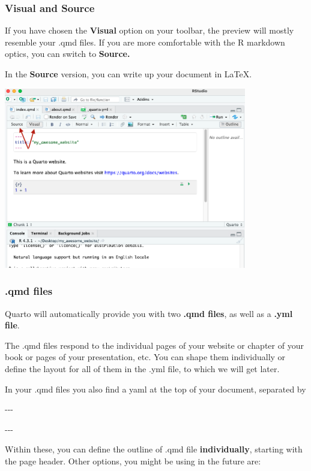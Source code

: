 \documentclass[
  letterpaper,
  DIV=11,
  numbers=noendperiod]{scrreprt}
\begin{document}
\hypertarget{visual-and-source}{%
\subsubsection{Visual and Source}\label{visual-and-source}}

If you have chosen the \textbf{Visual} option on your toolbar, the
preview will mostly resemble your .qmd files. If you are more
comfortable with the R markdown optics, you can switch to
\textbf{Source.}

In the \textbf{Source} version, you can write up your document in LaTeX.

\includegraphics[width=4.16667in,height=\textheight]{img/quarto_intro/Screenshot_3.png}

\hypertarget{qmd-files}{%
\subsubsection{.qmd files}\label{qmd-files}}

Quarto will automatically provide you with two \textbf{.qmd files}, as
well as a \textbf{.yml file}.

The .qmd files respond to the individual pages of your website or
chapter of your book or pages of your presentation, etc. You can shape
them individually or define the layout for all of them in the .yml file,
to which we will get later.

In your .qmd files you also find a yaml at the top of your document,
separated by

-\/-\/-

-\/-\/-

Within these, you can define the outline of .qmd file
\textbf{individually}, starting with the page header. Other options, you
might be using in the future are:
\end{document}

